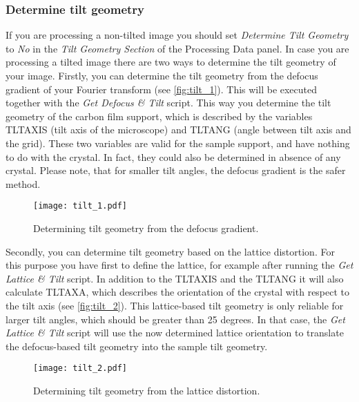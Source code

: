 \subsubsection{Determine tilt geometry}
\label{sec:det_tilt}



If you are processing a non-tilted image you should set \textit{Determine Tilt Geometry} to \textit{No} in the \textit{Tilt Geometry Section} of the Processing Data panel.
In case you are processing a tilted image there are two ways to determine the tilt geometry of your image. Firstly, you can determine the tilt geometry from the defocus gradient  of your Fourier transform (see \autoref{fig:tilt_1}). This will be executed together with the \textit{Get Defocus \& Tilt} script. This way you determine the tilt geometry of the carbon film support, which is described by the variables TLTAXIS (tilt axis of the microscope) and TLTANG (angle between tilt axis and the grid). These two variables are valid for the sample support, and have nothing to do with the crystal. In fact, they could also be determined in absence of any crystal. Please note, that for smaller tilt angles, the defocus gradient is the safer method.

\begin{figure}[H]
		\centering
		\texttt{[image: tilt\_1.pdf]}
		\caption{Determining tilt geometry from the defocus gradient.}
		\label{fig:tilt_1}
	\end{figure}
	

Secondly, you can determine tilt geometry based on the lattice distortion. For this purpose you have first to define the lattice, for example after running the \textit{Get Lattice \& Tilt} script. 
In addition to the TLTAXIS and the TLTANG it will also calculate TLTAXA, which describes the orientation of the crystal with respect to the tilt axis (see \autoref{fig:tilt_2}).
This lattice-based tilt geometry is only reliable for larger tilt angles, which should be greater than 25 degrees. In that case, the \textit{Get Lattice \& Tilt} script will use the now determined lattice orientation to translate the defocus-based tilt geometry into the sample tilt geometry.

\begin{figure}[H]
		\centering
		\texttt{[image: tilt\_2.pdf]}
		\caption{Determining tilt geometry from the lattice distortion.}
		\label{fig:tilt_2}
	\end{figure}
	



